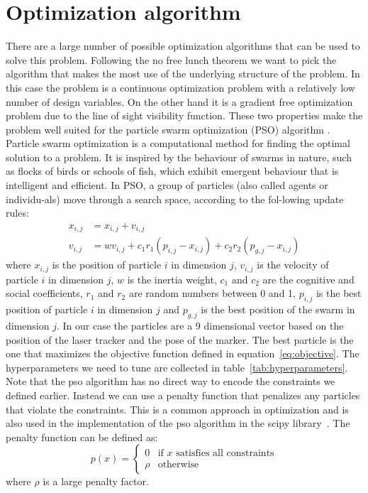 \documentclass{svproc}
\begin{document}
\section{Optimization algorithm}
There are a large number of possible optimization algorithms that can be used to solve this problem.
Following the no free lunch theorem \cite{no_free_lunch_theorem} we want to pick the algorithm that makes the most use of the underlying structure of the problem.
In this case the problem is a continuous optimization problem with a relatively low number of design variables.
On the other hand it is a gradient free optimization problem due to the line of sight visibility function.
These two properties make the problem well suited for the particle swarm optimization (PSO) algorithm \cite{pso}.
Particle swarm optimization is a computational method for finding the optimal solution to a problem.
It is inspired by the behaviour of swarms in nature, such as flocks of birds or schools of fish, which exhibit emergent behaviour that is intelligent and efficient.
 In PSO, a group of particles (also called agents or individu-als) move through a search space, according to the fol-lowing update rules:
\begin{equation}
        \begin{split}
        x_{i,j} &= x_{i,j} + v_{i,j} \\
    v_{i,j} &= wv_{i,j} + c_1r_1(p_{i,j}-x_{i,j}) + c_2r_2(p_{g,j}-x_{i,j})
        \end{split}
\end{equation}
where $x_{i,j}$ is the position of particle $i$ in dimension $j$, $v_{i,j}$ is the velocity of particle $i$ in dimension $j$, $w$ is the inertia weight,
 $c_1$ and $c_2$ are the cognitive and social coefficients, $r_1$ and $r_2$ are random numbers between 0 and 1, $p_{i,j}$ is the best position of particle $i$ in dimension $j$ and $p_{g,j}$
is the best position of the swarm in dimension $j$.
In our case the particles are a 9 dimensional vector based on the position of the laser tracker and the pose of the marker.
The best particle is the one that maximizes the objective function defined in equation~\ref{eq:objective}.
The hyperparameters we need to tune are collected in table~\ref{tab:hyperparameters}.
Note that the pso algorithm has no direct way to encode the constraints we defined earlier.
Instead we can use a penalty function that penalizes any particles that violate the constraints.
This is a common approach in optimization and is also used in the implementation of the pso algorithm in the scipy library~\cite{2020SciPy-NMeth}.
The penalty function can be defined as:
\begin{equation}
    p(x) =  \begin{cases}
        0 & \text{if } x \text{ satisfies all constraints} \\
        \rho & \text{otherwise}
    \end{cases}
\end{equation}
where $\rho$ is a large penalty factor.
\end{document}
